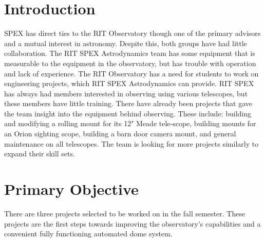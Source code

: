 \documentclass[conference]{IEEEtran} %
\begin{document}

\section{Introduction}
\label{sec:introduction}

 SPEX has direct ties to the RIT Observatory though one of the primary advisors and a mutual interest in astronomy.
Despite this, both groups have had little collaboration.
The RIT SPEX Astrodynamics team has some equipment that is measurable to the equipment in the observatory, but has trouble with operation and lack of experience.
The RIT Observatory has a need for students to work on engineering projects, which RIT SPEX Astrodynamics can provide.
RIT SPEX has always had members interested in observing using various telescopes, but these members have little training.
There have already been projects that gave the team insight into the equipment behind observing.
These include: building and modifying a rolling mount for its 12" Meade tele-scope, building mounts for an Orion sighting scope, building a barn door camera mount, and general maintenance on all telescopes.
The team is looking for more projects similarly to expand their skill sets.

\section{Primary Objective}
\label{sec:primary-obj}

  There are three projects selected to be worked on in the fall semester.
  These projects are the first steps towards improving the observatory’s capabilities and a convenient fully functioning automated dome system.
\end{document}

